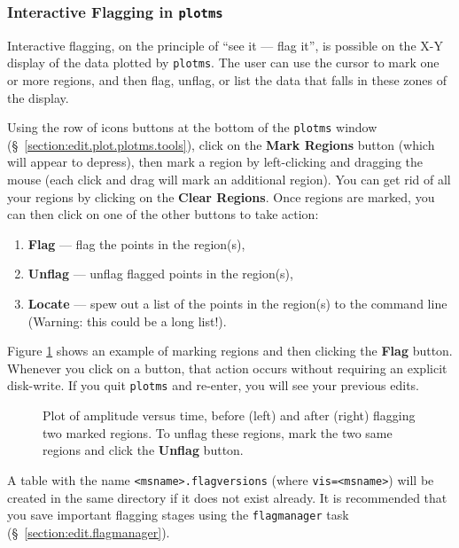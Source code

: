
\subsubsection{Interactive Flagging in {\tt plotms}}
\label{section:edit.plot.plotms.flag}

Interactive flagging, on the principle of ``see it --- flag it'', is possible on the X-Y display of the data plotted by {\tt plotms}.  The user can
use the cursor to mark one or more regions, and then flag, unflag, or list the data that falls in these zones of the display.

Using the row of icons buttons at the bottom of the {\tt plotms} window (\S~\ref{section:edit.plot.plotms.tools}), click on the {\bf Mark Regions} button (which will appear to depress), then mark a region by left-clicking and dragging the mouse (each click and drag will mark an additional region).  You can get rid of all your regions by clicking on the {\bf Clear Regions}. Once regions are marked, you can then click on one of the other buttons to take action:
\begin{enumerate}
\item {\bf Flag} --- flag the points in the region(s),
\item {\bf Unflag} --- unflag flagged points in the region(s),
\item {\bf Locate} --- spew out a list of the points in the region(s) to the command line (Warning: this could be a long list!).
\end{enumerate}
Figure \ref{fig:markflags} shows an example of marking regions and then clicking the {\bf Flag} button. Whenever you click on a button, that action occurs without requiring an explicit disk-write.  If you quit {\tt plotms} and re-enter, you will see your previous edits.

\begin{figure}[h!]
\begin{center}
\caption{\label{fig:markflags} Plot of amplitude versus time, before (left) and after (right) flagging two marked regions. To unflag these regions, mark the two same regions and click the {\bf Unflag} button.}
\hrulefill
\end{center}
\end{figure}

A table with the name {\tt <msname>.flagversions} (where {\tt vis=<msname>}) will be created in the same directory if it does not exist already. It is recommended that you save important flagging stages using the {\tt flagmanager} task (\S~\ref{section:edit.flagmanager}).

